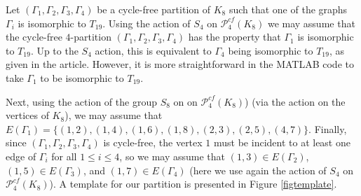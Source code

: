 \documentclass[reqno,11pt]{amsart}
\theoremstyle{definition}
\theoremstyle{remark}
\numberwithin{equation}{section}
\begin{document}
Let $(\Gamma_1, \Gamma_2, \Gamma_3, \Gamma_4)$ be a cycle-free partition of $K_8$ such that one of the graphs $\Gamma_i$ is isomorphic to $T_{19}$. Using the action of $S_4$ on $\mathcal{P}_4^{cf}(K_8)$ we may assume that the cycle-free $4$-partition $(\Gamma_1, \Gamma_2, \Gamma_3, \Gamma_4)$ has the property that $\Gamma_1$ is isomorphic to $T_{19}$. Up to the $S_4$ action, this is equivalent to $\Gamma_4$ being isomorphic to $T_{19}$, as given in the article. However, it is more straightforward in the MATLAB code to take $\Gamma_1$ to be isomorphic to $T_{19}$.

Next, using the action of the group $S_8$ on on $\mathcal{P}_4^{cf}(K_8)$) (via the action on the vertices of $K_8$), we may assume that $E(\Gamma_1)=\{(1,2), (1,4), (1,6), (1,8), (2,3), (2,5), (4,7)\}$. Finally, since $(\Gamma_1, \Gamma_2, \Gamma_3, \Gamma_4)$ is cycle-free, the vertex $1$ must be incident to at least one edge of $\Gamma_i$ for all $1\leq i\leq 4$, so we may assume that $(1,3)\in E(\Gamma_2)$, $(1,5)\in E(\Gamma_3)$, and $(1,7)\in E(\Gamma_4)$ (here we use again the action of $S_4$ on $\mathcal{P}_4^{cf}(K_8)$).  A template for our partition is presented in Figure \ref{figtemplate}. 
\end{document}
